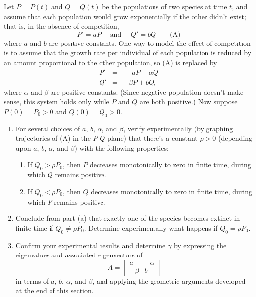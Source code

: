 \documentclass{ximera}
\begin{document}
\begin{problem}\label{exer:10.4.42} 
Let $P=P(t)$ and $Q=Q(t)$ be the populations of two species at time
$t$, and assume that each population would grow exponentially if the
other didn't exist; that is, in the absence of competition,
$$
P'=aP \quad\text{ and }\quad Q'=bQ
\quad\quad \text{(A)}
$$
where $a$ and $b$ are positive constants. One way to model the effect
of competition is to assume that the growth rate per individual of
each population is reduced by an amount proportional to the other
population, so (A) is replaced by
\begin{eqnarray*}
P'&=&\phantom{-}aP-\alpha Q\\
Q'&=&-\beta P+bQ,
\end{eqnarray*}
where $\alpha$ and $\beta$ are positive constants. (Since negative
population doesn't make sense, this system holds only while $P$ and
$Q$ are both positive.) Now suppose $P(0)=P_0>0$ and
$Q(0)=Q_0>0$.

\begin{enumerate}
\item %
For several choices of $a$, $b$, $\alpha$, and $\beta$, verify
experimentally
(by graphing trajectories of (A) in the $P$-$Q$ plane) that there's a
constant $\rho>0$ (depending upon $a$, $b$, $\alpha$, and $\beta$) with the
following properties:
\begin{enumerate}
\item %
If $Q_0>\rho P_0$, then $P$ decreases monotonically to zero
in finite time, during which $Q$ remains positive.
\item %
If $Q_0<\rho P_0$, then $Q$ decreases monotonically to zero in
finite time, during which $P$ remains positive.
\end{enumerate}
\item %
Conclude from  part (a) that exactly one of the species
becomes extinct in finite time if $Q_0\ne\rho P_0$. Determine
experimentally what happens if $Q_0=\rho P_0$.
\item %
Confirm your experimental results and determine $\gamma$ by expressing
the eigenvalues and associated eigenvectors of
$$
A=\begin{bmatrix} a &-\alpha\\-\beta&b\end{bmatrix}
$$
in terms of $a$, $b$, $\alpha$, and $\beta$, and applying the geometric
arguments developed at the end of this section.
\end{enumerate}


\end{problem}
\end{document}
